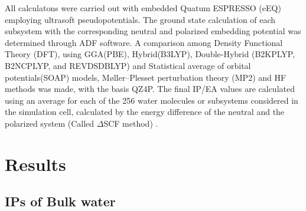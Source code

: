 \documentclass[12pt,a4paper]{article}
\begin{document}
All calculatons were carried out with embedded Quatum ESPRESSO (eEQ) employing ultrasoft pseudopotentials. The ground state calculation of each
subsystem with the corresponding neutral and polarized embedding potential was determined through ADF \cite{te2001chemistry} software. A comparison
among Density Functional Theory (DFT), using GGA(PBE), Hybrid(B3LYP), Double-Hybrid (B2KPLYP, B2NCPLYP, and REVDSDBLYP) and Statistical average of
orbital potentials(SOAP) models, Møller–Plesset perturbation theory (MP2) and HF methods was made, with the basis QZ4P. The final IP/EA values are
calculated using an average for each of the 256 water molecules or subsystems considered in the simulation cell, calculated by the energy difference
of the neutral and the polarized system (Called $\Delta$SCF method) \cite{bagus1965self,waskom2017mwaskom}.

\section{Results}
\subsection{IPs of Bulk water}
\end{document}
